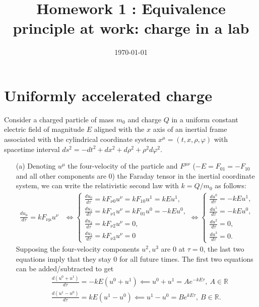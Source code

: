 \documentclass[10pt, a4paper]{article}
\title{Homework 1 : Equivalence principle at
work: charge in a lab} %
\author{\PA} %
\date{\today} %
\begin{document}
\maketitlepage

\maketableofcontents


\section{Uniformly accelerated charge}
Consider a charged particle of mass $m_0$ and charge $Q$ in a uniform constant electric field of magnitude $E$ aligned with the $x$ axis of an inertial frame associated with the cylindrical coordinate system $x^\mu = (t, x, \rho, \varphi)$ with spacetime interval $d s^2=-d t^2+d x^2+d \rho^2+\rho^2 d \varphi^2$. 
\begin{enumerate}
  \item[(a)] Denoting $u^{\mu}$ the four-velocity of the particle and $F^{\mu\nu}$ ($-E = F_{01} = -F_{10}$ and all other components are $0$) the Faraday tensor in the inertial coordinate system, we can write the relativistic second law with $k=Q / m_0$ as follows: 
  \begin{align*}
    \frac{d u_\mu}{d \tau}=k F_{\nu\mu} u^\nu &\iff 
    \begin{cases}
      \frac{d u_0}{d \tau}=k F_{\nu 0} u^\nu= k F_{1 0} u^1 = kE u^1,\\
      \frac{d u_1}{d \tau}=k F_{\nu 1} u^\nu = k F_{0 1} u^0 = -kE u^{0},\\
      \frac{d u_2}{d \tau}=k F_{\nu 2} u^\nu = 0,\\
      \frac{d u_3}{d \tau}=k F_{\nu 3} u^\nu = 0
    \end{cases}
    \iff 
    \begin{cases}
      \frac{d u^0}{d \tau} = -kE u^1,\\
      \frac{d u^1}{d \tau} = -kE u^{0},\\
      \frac{d u^2}{d \tau}= 0,\\
      \frac{d u^3}{d \tau} = 0.
    \end{cases}
  \end{align*} 
  Supposing the four-velocity components $u^2, u^3$ are $0$ at $\tau = 0$, the last two equations imply that they stay $0$ for all future times. The first two equations can be added/subtracted to get 
  \begin{align*}
    &\frac{d (u^0 + u^{1})}{d \tau} = -kE (u^{0} + u^1) \impliedby u^{0} + u^1 = A e^{-kE \tau},\  A\in \mathbb{R}\\
    &\frac{d (u^1-u^{0})}{d \tau} = kE (u^1 - u^{0}) \impliedby u^{1} - u^0 = B e^{kE \tau},\ B\in \mathbb{R}.

\end{align*}
\end{enumerate}
\end{document}
